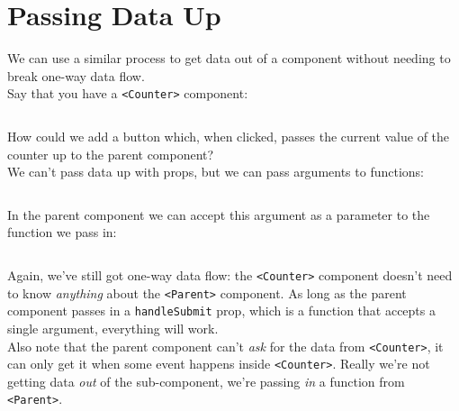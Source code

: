 \section{Passing Data Up}

We can use a similar process to get data out of a component without needing to break one-way data flow.
\\

Say that you have a \texttt{<Counter>} component:

\inputminted{js}{01-one-way-data-flow/figures/07-Counter.jsx}

How could we add a button which, when clicked, passes the current value of the counter up to the parent component?
\\

We can't pass data up with props, but we can pass arguments to functions:

\inputminted{js}{01-one-way-data-flow/figures/08-Counter-with-parent.jsx}

In the parent component we can accept this argument as a parameter to the function we pass in:

\inputminted{js}{01-one-way-data-flow/figures/09-Parent.jsx}

Again, we've still got one-way data flow: the \texttt{<Counter>} component doesn't need to know \textit{anything} about the \texttt{<Parent>} component. As long as the parent component passes in a \texttt{handleSubmit} prop, which is a function that accepts a single argument, everything will work.
\\

Also note that the parent component can't \textit{ask} for the data from \texttt{<Counter>}, it can only get it when some event happens inside \texttt{<Counter>}. Really we're not getting data \textit{out} of the sub-component, we're passing \textit{in} a function from \texttt{<Parent>}.
